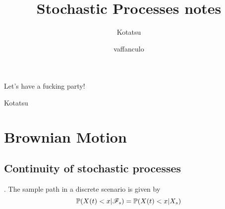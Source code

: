 \documentclass{report}
\begin{document}
	\title{Stochastic Processes notes}
	\author{Kotatsu}
	\date{\small vaffanculo}
	\maketitle
	\begin{preface}
Let's have a fucking party!
		
		\vskip1.2cm
		
		\hfill Kotatsu
	\end{preface}
\section{Brownian Motion}	
	\subsection{Continuity of stochastic processes}.
	The sample path in a discrete scenario is given by
	\begin{equation*}
		\mathbb{P}(X(t)<x|\mathscr{F}_{s})=\mathbb{P}(X(t)<x|X_{s})
	\end{equation*}
	\tableofcontents
\clearpage
\listoffigures  
\end{document}
